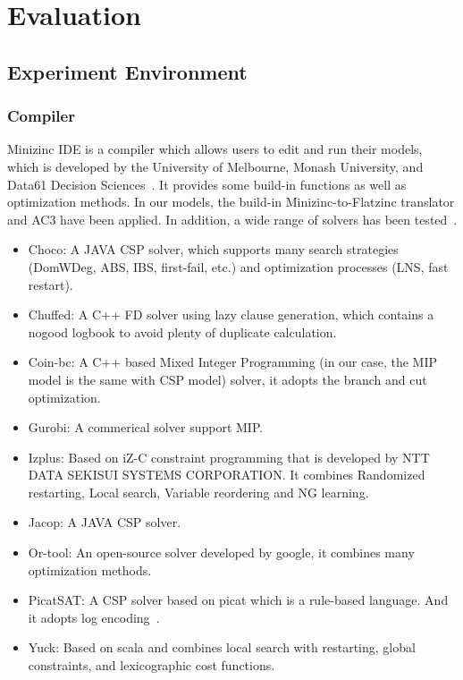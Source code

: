 \chapter{Evaluation}
\label{cha:evaluation}
\section{Experiment Environment}
\subsection{Compiler}
\label{section:compiler}
Minizinc IDE is a compiler which allows users to edit and run their models, which is developed by the University of Melbourne, Monash University, and Data61 Decision Sciences~\cite{r6}. It provides some build-in functions as well as optimization methods. In our models, the build-in Minizinc-to-Flatzinc translator and AC3 have been applied. In addition, a wide range of solvers has been tested~\cite{r6}.
\begin{itemize}
    \item Choco: A JAVA CSP solver, which supports many search strategies (DomWDeg, ABS, IBS, first-fail, etc.) and optimization processes (LNS, fast restart).
    \item Chuffed: A C++ FD solver using lazy clause generation, which contains a nogood logbook to avoid plenty of duplicate calculation.
    \item Coin-bc: A C++ based Mixed Integer Programming (in our case, the MIP model is the same with CSP model) solver, it adopts the branch and cut optimization.
    \item Gurobi: A commerical solver support MIP.
    \item Izplus: Based on iZ-C constraint programming that is developed by NTT DATA SEKISUI SYSTEMS CORPORATION. It combines Randomized restarting, Local search, Variable reordering and NG learning.
    \item Jacop: A JAVA CSP solver.
    \item Or-tool: An open-source solver developed by google, it combines many optimization methods.
    \item PicatSAT: A CSP solver based on picat which is a rule-based language. And it adopts log encoding~\cite{r8}.
    \item Yuck: Based on scala and combines local search with restarting, global constraints, and lexicographic cost functions.
\end{itemize}
